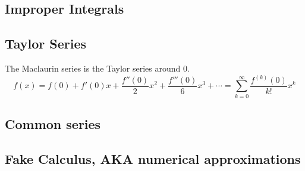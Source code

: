 \subsection{Improper Integrals}


\subsection{Taylor Series}

The Maclaurin series is the Taylor series around \(0\).
\begin{equation}
f(x) = f(0) + f'(0) x + \frac{f''(0)} 2 x^2 + \frac{f'''(0)}{6}x^3 +\dotsb
  = \sum_{k=0}^\infty \frac{f^{(k)}(0)}{k!}x^k
\end{equation}

\subsection{Common series}

\subsection{Fake Calculus, AKA numerical approximations}
